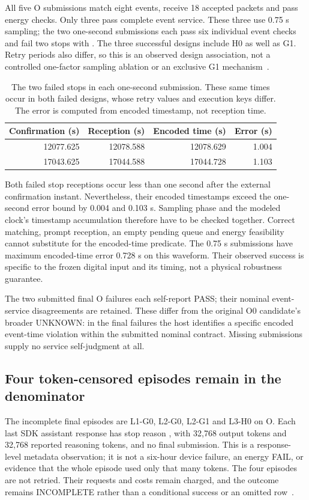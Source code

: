 All five O submissions match eight events, receive 18 accepted packets and
pass energy checks. Only three pass complete event service. These three use
0.75 s sampling; the two one-second submissions each pass six individual event
checks and fail two stops with . The three successful
designs include H0 as well as G1. Retry periods also differ, so this is an
observed design association, not a controlled one-factor sampling ablation or
an exclusive G1 mechanism~\cite{details}.

\begin{table}[htbp]
\centering\small
\caption{The two failed stops in each one-second submission. These same times occur in both failed designs, whose retry values and execution keys differ. The error is computed from encoded timestamp, not reception time.}
\label{tab:stamp}
\begin{tabular}{@{}rrrr@{}}\toprule
Confirmation (s) & Reception (s) & Encoded time (s) & Error (s) \\\midrule
12077.625 & 12078.588 & 12078.629 & 1.004 \\
17043.625 & 17044.588 & 17044.728 & 1.103 \\
\bottomrule\end{tabular}
\end{table}

Both failed stop receptions occur less than one second after the external
confirmation instant. Nevertheless, their encoded timestamps exceed the one-second
error bound by 0.004 and 0.103 s. Sampling phase and the modeled clock's timestamp
accumulation therefore have to be checked together. Correct matching, prompt
reception, an empty pending queue and energy feasibility cannot substitute for
the encoded-time predicate. The 0.75 s submissions have maximum encoded-time
error 0.728 s on this waveform. Their observed success is specific to the
frozen digital input and its timing, not a physical robustness guarantee.

The two submitted final O failures each self-report PASS; their nominal
event-service disagreements are retained. These differ from the original O0
candidate's broader UNKNOWN: in the final failures the host identifies a
specific encoded event-time violation within the submitted nominal contract.
Missing submissions supply no service self-judgment at all.

\subsection{Four token-censored episodes remain in the denominator}
The incomplete final episodes are L1-G0, L2-G0, L2-G1 and L3-H0 on O.
Each last SDK assistant response has stop reason , with 32,768
output tokens and 32,768 reported reasoning tokens, and no final submission.
This is a response-level metadata observation; it is not a six-hour device
failure, an energy FAIL, or evidence that the whole episode used only that
many tokens. The four episodes are not retried. Their requests and costs
remain charged, and the outcome remains INCOMPLETE rather than a conditional
success or an omitted row~\cite{details,analysis}.

